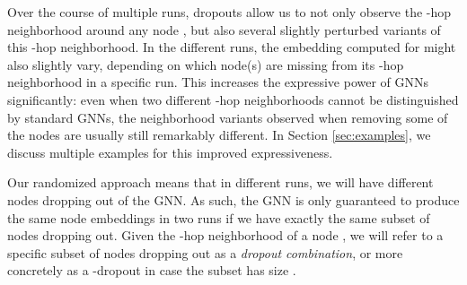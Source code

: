 \documentclass{article}
\begin{document}
Over the course of multiple runs, dropouts allow us to not only observe the -hop neighborhood around any node , but also several slightly perturbed variants of this -hop neighborhood. In the different runs, the embedding computed for  might also slightly vary, depending on which node(s) are missing from its -hop neighborhood in a specific run. This increases the expressive power of GNNs significantly: even when two different -hop neighborhoods cannot be distinguished by standard GNNs, the neighborhood variants observed when removing some of the nodes are usually still remarkably different. In Section \ref{sec:examples}, we discuss multiple examples for this improved expressiveness.

Our randomized approach means that in different runs, we will have different nodes dropping out of the GNN. As such, the GNN is only guaranteed to produce the same node embeddings in two runs if we have exactly the same subset of nodes dropping out. Given the -hop neighborhood of a node , we will refer to a specific subset of nodes dropping out as a \textit{dropout combination}, or more concretely as a -dropout in case the subset has size .
\end{document}
